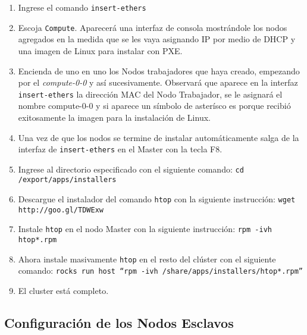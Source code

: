 \begin{enumerate}
\item Ingrese el comando \texttt{insert-ethers}

\item Escoja \texttt{Compute}. Aparecerá una interfaz de consola mostrándole los nodos agregados en la medida que se les vaya asignando IP por medio de DHCP y una imagen de Linux para instalar con PXE.

\item Encienda de uno en uno los Nodos trabajadores que haya creado, empezando por el \textit{compute-0-0} y así sucesivamente. Observará que aparece en la interfaz \texttt{insert-ethers} la dirección MAC del Nodo Trabajador, se le asignará el nombre compute-0-0 y si aparece un símbolo de asterísco es porque recibió exitosamente la imagen para la instalación de Linux.

\item Una vez de que los nodos se termine de instalar automáticamente salga de la interfaz de \texttt{insert-ethers} en el Master con la tecla F8.

\item Ingrese al directorio especificado con el siguiente comando: \texttt{cd /export/apps/installers}

\item Descargue el instalador del comando \texttt{htop} con la siguiente instrucción: \texttt{wget http://goo.gl/TDWExw}

\item Instale \texttt{htop} en el nodo Master con la siguiente instrucción: \texttt{rpm -ivh htop*.rpm}

\item Ahora instale masivamente \texttt{htop} en el resto del clúster con el siguiente comando: \texttt{rocks run host ``rpm -ivh /share/apps/installers/htop*.rpm''}

\item El cluster está completo.

\end{enumerate}

\subsection{Configuración de los Nodos Esclavos}

